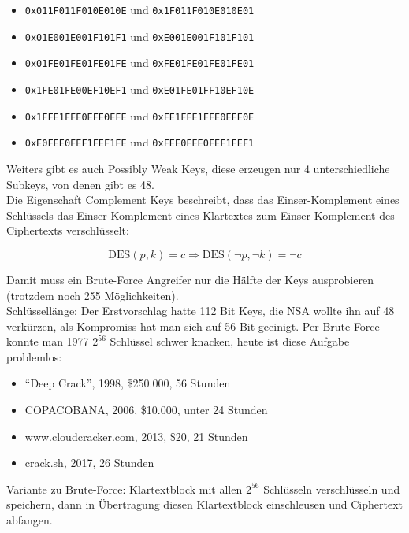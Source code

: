 \begin{itemize}
    \item \verb|0x011F011F010E010E| und \verb|0x1F011F010E010E01|
    \item \verb|0x01E001E001F101F1| und \verb|0xE001E001F101F101|
    \item \verb|0x01FE01FE01FE01FE| und \verb|0xFE01FE01FE01FE01|
    \item \verb|0x1FE01FE00EF10EF1| und \verb|0xE01FE01FF10EF10E|
    \item \verb|0x1FFE1FFE0EFE0EFE| und \verb|0xFE1FFE1FFE0EFE0E|
    \item \verb|0xE0FEE0FEF1FEF1FE| und \verb|0xFEE0FEE0FEF1FEF1|
\end{itemize}

Weiters gibt es auch Possibly Weak Keys, diese erzeugen nur 4 unterschiedliche Subkeys, von denen gibt es 48.\\

Die Eigenschaft Complement Keys  beschreibt, dass das Einser-Komplement eines Schlüssels das Einser-Komplement eines Klartextes zum 
Einser-Komplement des Ciphertexts verschlüsselt: 

$$\text{DES}(p, k) = c \Rightarrow \text{DES}(\lnot p, \lnot k) = \lnot c$$

Damit muss ein Brute-Force Angreifer nur die Hälfte der Keys ausprobieren (trotzdem noch 255 Möglichkeiten).\\


Schlüssellänge: Der Erstvorschlag hatte 112 Bit Keys, die NSA wollte ihn auf 48 verkürzen, als Kompromiss hat man sich auf 56 Bit geeinigt.
Per Brute-Force konnte man 1977 $2^{56}$ Schlüssel schwer knacken, heute ist diese Aufgabe problemlos:

\begin{itemize}
    \item ``Deep Crack'', 1998, \$250.000, 56 Stunden
    \item COPACOBANA, 2006, \$10.000, unter 24 Stunden
    \item \url{www.cloudcracker.com}, 2013, \$20, 21 Stunden
    \item crack.sh, 2017, 26 Stunden
\end{itemize}

Variante zu Brute-Force: Klartextblock mit allen $2^{56}$ Schlüsseln verschlüsseln und speichern, dann in Übertragung diesen
Klartextblock einschleusen und Ciphertext abfangen. \\

